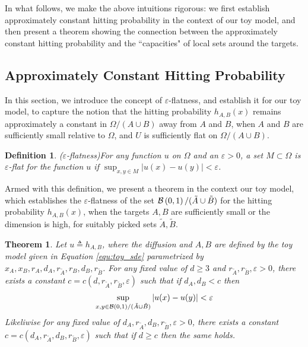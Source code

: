 \documentclass[english, aip, jcp, priprint, graphicx]{revtex4-1}
\newtheorem{definition}{Definition}
\newtheorem{theorem}{Theorem}
\theoremstyle{plain}
\theoremstyle{definition}
\theoremstyle{plain}
\begin{document}
In what follows, we make the above intuitions rigorous: we first establish approximately constant hitting probability in the context of our toy model, and then present a theorem showing the connection between the approximately constant hitting probability and the ``capacities" of local sets around the targets.

\subsection{Approximately Constant Hitting Probability}

In this section, we introduce the concept of $\varepsilon$-flatness, and establish it for our toy model, to capture the notion that the hitting probability $h_{A, B}(x)$ remains approximately a constant in $\Omega / (A\cup B)$ away from $A$ and $B$, when $A$ and $B$ are sufficiently small relative to $\Omega$, and $U$ is sufficiently flat on $\Omega / (A\cup B)$.

\begin{definition}($\varepsilon$-flatness)\label{def:epsilon_flat}
For any function $u$ on $\Omega$ and an $\varepsilon > 0$, a set $M\subset \Omega$ is $\varepsilon$-flat for the function $u$ if $\sup_{x, y \in M} | u (x) - u (y) | < \varepsilon$.
\end{definition}

Armed with this definition, we present a theorem in the context our toy model, which establishes the $\varepsilon$-flatness of the set $\mathcal{B}\left(0, 1\right) / (\tilde{A} \cup \tilde{B})$ for the hitting probability $h_{A, B}(x)$, when the targets $A, B$ are sufficiently small or the dimension is high, for suitably picked sets $\tilde{A}, \tilde{B}$.

\begin{theorem}\label{thm:epsilon_flat}
Let $u\triangleq h_{A, B}$, where the diffusion and $A, B$ are defined by the toy model given in Equation \ref{equ:toy_sde} parametrized by $x_A, x_B, r_A, d_A, r_{\tilde{A}}, r_B, d_B, r_{\tilde{B}}$. For any fixed value of $d \geq 3$ and $r_{\tilde{A}}, r_{\tilde{B}}, \varepsilon > 0$, there exists a constant $c=c(d, r_{\tilde{A}}, r_{\tilde{B}}, \varepsilon)$ such that if $d_{A}, d_{B} < c$ then
\begin{equation*}
	\sup_{x, y \in \mathcal{B}\left(0, 1\right) / (\tilde{A} \cup \tilde{B})}|u(x)-u(y)| < \varepsilon
\end{equation*}
Likeliwise for any fixed value of $d_{A}, r_{\tilde{A}}, d_{B}, r_{\tilde{B}}, \varepsilon>0$, there exists a constant $c=c(d_{A}, r_{\tilde{A}}, d_{B}, r_{\tilde{B}}, \varepsilon)$ such that if $d \geq c$ then the same holds.
\end{theorem}
\end{document}
